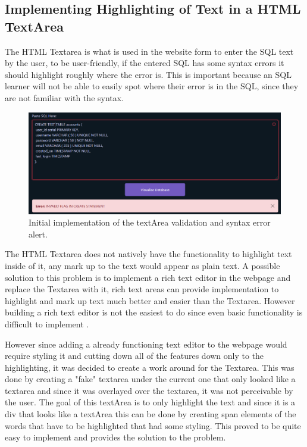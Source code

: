 
\subsection{Implementing Highlighting of Text in a HTML TextArea}

The HTML Textarea is what is used in the website form to enter the SQL text by the user, to be user-friendly, if the entered SQL has some syntax errors it should highlight roughly where the error is. This is important because an SQL learner will not be able to easily spot where their error is in the SQL, since they are not familiar with the syntax. 

\begin{figure}[h!]
	\centering
	\includegraphics[width=\textwidth]{textArea}
	\caption{Initial implementation of the textArea validation and syntax error alert.}
	\label{fig:textArea}
\end{figure}

The HTML Textarea does not natively have the functionality to highlight text inside of it, any mark up to the text would appear as plain text. A possible solution to this problem is to implement a rich text editor in the webpage and replace the Textarea with it, rich text areas can provide implementation to highlight and mark up text much better and easier than the Textarea. However building a rich text editor is not the easiest to do since even basic functionality is difficult to implement \cite{highlightText}.

However since adding a already functioning text editor to the webpage would require styling it and cutting down all of the features down only to the highlighting, it was decided to create a work around for the Textarea. This was done by creating a "fake" textarea under the current one that only looked like a textarea and since it was overlayed over the textarea, it was not perceivable by the user. The goal of this textArea is to only highlight the text and since it is a div that looks like a textArea this can be done by creating span elements of the words that have to be highlighted that had some styling. This proved to be quite easy to implement and provides the solution to the problem.

